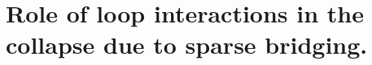 \documentclass[
preprint,
a4paper,
12pt,
superscriptaddress,
pre]{revtex4}
\begin{document}






  


%

\section{Role of loop interactions in the collapse due to sparse
  bridging.}
\label{sec:incl-star-polym}
\end{document}

